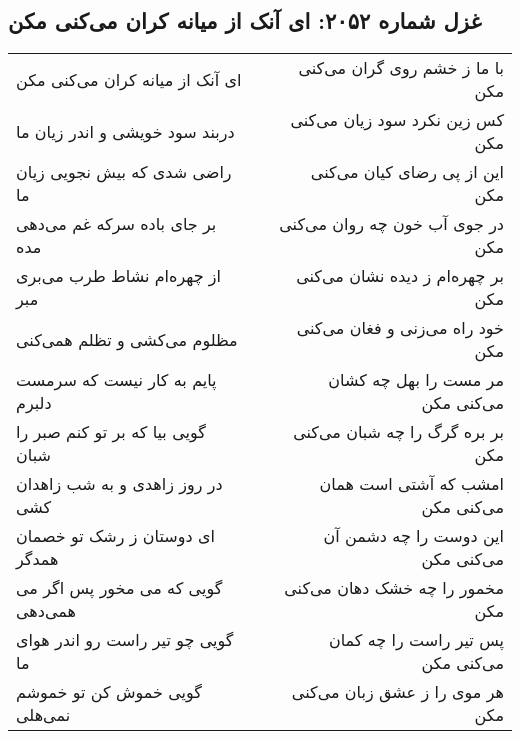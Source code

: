 \begin{center}
\section*{غزل شماره ۲۰۵۲: ای آنک از میانه کران می‌کنی مکن}
\label{sec:2052}
\begin{longtable}{l p{0.5cm} r}
ای آنک از میانه کران می‌کنی مکن
&&
با ما ز خشم روی گران می‌کنی مکن
\\
دربند سود خویشی و اندر زیان ما
&&
کس زین نکرد سود زیان می‌کنی مکن
\\
راضی شدی که بیش نجویی زیان ما
&&
این از پی رضای کیان می‌کنی مکن
\\
بر جای باده سرکه غم می‌دهی مده
&&
در جوی آب خون چه روان می‌کنی مکن
\\
از چهره‌ام نشاط طرب می‌بری مبر
&&
بر چهره‌ام ز دیده نشان می‌کنی مکن
\\
مظلوم می‌کشی و تظلم همی‌کنی
&&
خود راه می‌زنی و فغان می‌کنی مکن
\\
پایم به کار نیست که سرمست دلبرم
&&
مر مست را بهل چه کشان می‌کنی مکن
\\
گویی بیا که بر تو کنم صبر را شبان
&&
بر بره گرگ را چه شبان می‌کنی مکن
\\
در روز زاهدی و به شب زاهدان کشی
&&
امشب که آشتی است همان می‌کنی مکن
\\
ای دوستان ز رشک تو خصمان همدگر
&&
این دوست را چه دشمن آن می‌کنی مکن
\\
گویی که می مخور پس اگر می همی‌دهی
&&
مخمور را چه خشک دهان می‌کنی مکن
\\
گویی چو تیر راست رو اندر هوای ما
&&
پس تیر راست را چه کمان می‌کنی مکن
\\
گویی خموش کن تو خموشم نمی‌هلی
&&
هر موی را ز عشق زبان می‌کنی مکن
\\
\end{longtable}
\end{center}
